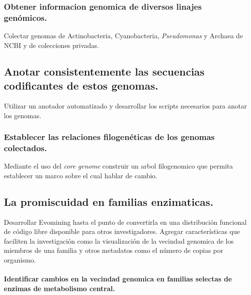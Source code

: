 \documentclass[12pt,twoside]{reedthesis}
\begin{document}
  \subsubsection{Obtener informacion genomica de diversos linajes
  genómicos.}\label{obtener-informacion-genomica-de-diversos-linajes-genomicos.}
  
  Colectar genomas de Actinobacteria, Cyanobacteria, \emph{Pseudomonas} y
  Archaea de NCBI y de colecciones privadas.
  
  \subsection{Anotar consistentemente las secuencias codificantes de estos
  genomas.}\label{anotar-consistentemente-las-secuencias-codificantes-de-estos-genomas.}
  
  Utilizar un anotador automatizado y desarrollar los scripts necesarios
  para anotar los genomas.
  
  \subsubsection{Establecer las relaciones filogenéticas de los genomas
  colectados.}\label{establecer-las-relaciones-filogeneticas-de-los-genomas-colectados.}
  
  Mediante el uso del \emph{core genome} construir un arbol filogenomico
  que permita establecer un marco sobre el cual hablar de cambio.
  
  \subsection{La promiscuidad en familias
  enzimaticas.}\label{la-promiscuidad-en-familias-enzimaticas.}
  
  Desarrollar Evomining hasta el punto de convertirla en una distribución
  funcional de código libre disponible para otros investigadores. Agregar
  características que faciliten la investigación como la visualización de
  la vecindad genomica de los miembros de una familia y otros metadatos
  como el número de copias por organismo.
  
  \paragraph{Identificar cambios en la vecindad genomica en familias
  selectas de enzimas de metabolismo
  central.}\label{identificar-cambios-en-la-vecindad-genomica-en-familias-selectas-de-enzimas-de-metabolismo-central.}
  
\end{document}
